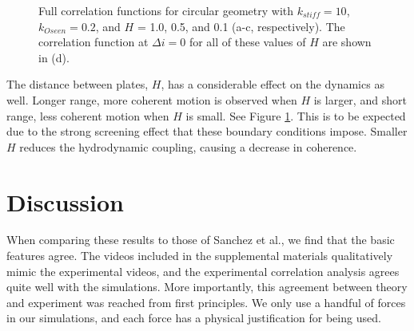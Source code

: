\documentclass[11pt]{ucthesis}
\begin{document}
\begin{figure}
{}
\qquad
{}
\caption{Full correlation functions for circular geometry with
$k_{stiff}=10$, $k_{Oseen}=0.2$, and $H$ = 1.0, 0.5, and 0.1 (a-c,
respectively). The correlation function at $\Delta i = 0$ for all
of these values of $H$ are shown in (d).  
\label{fig:H}} 
\end{figure}


The distance between plates, $H$, has a considerable effect on the dynamics
as well. Longer range, more coherent motion is observed when $H$ is larger, and
short range, less coherent motion when $H$ is small. See Figure \ref{fig:H}. This
is to be expected due to the strong screening effect that these boundary conditions
impose. Smaller $H$ reduces the hydrodynamic coupling, causing a decrease in coherence.


\section{Discussion}
\label{sec:disc}
When comparing these results to those of
Sanchez et al., we find that the basic features agree. The videos
included in the supplemental materials qualitatively mimic the
experimental videos, and the experimental correlation analysis
agrees quite well with the simulations. More importantly, this agreement between
theory and experiment was reached from first principles. We only
use a handful of forces in our simulations, and each force has a
physical justification for being used.
\end{document}
